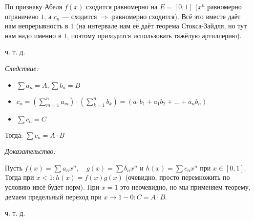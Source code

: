 \documentclass{article}
\begin{document}
По признаку Абеля $f(x)$ сходится равномерно на $E = [0, 1]$ ($x^n$ равномерно ограничено $1$, а $c_n$ --- сходится $\Rightarrow$ равномерно сходится). Всё это вместе даёт нам непрерывность в $1$ (на интервале нам её даёт теорема Стокса-Зайдля, но тут нам надо именно в $1$, поэтому приходится использовать тяжёлую артиллерию).

ч. т. д.

\textit{Следствие:}

\begin{itemize}
    \item $\sum a_n = A, \sum b_n = B$
    \item $c_n = \left(\sum_{m = 1}^{n} a_m \right) \cdot \left(\sum_{k = 1}^{n} b_k \right) = (a_1b_1 + a_1b_2 + \ldots + a_nb_n)$
    \item $\sum c_n = C$
\end{itemize}

Тогда: $\sum c_n = A \cdot B$

\textit{Доказательство:}

Пусть $f(x) = \sum a_nx^n, \quad g(x) = \sum b_nx^n$ и $h(x) = \sum c_nx^n$ при $x \in [0, 1]$. Тогда при $x < 1: h(x) = f(x)g(x)$ (очевидно, просто перемножить по  условию ивсё будет норм). При $x = 1$ это неочевидно, но мы применяем теорему, демаем предельный переход при $x \rightarrow 1 - 0: C = A \cdot B$.

ч. т. д.

\newpage
\end{document}
